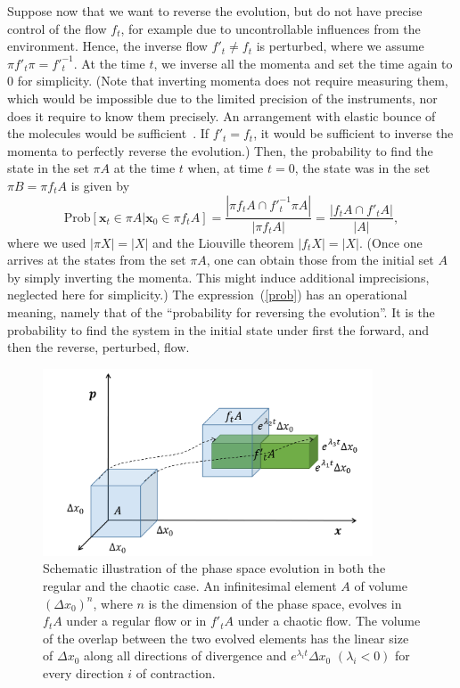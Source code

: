 \documentclass[12pt]{article}
\begin{document}
Suppose now that we want to reverse the evolution, but do not have precise control of the flow $f_t$, for example due to uncontrollable influences from the environment. Hence, the inverse flow $f'_t \neq f_t$ is perturbed, where we assume $\pi f'_t \pi =f'^{-1}_t$.
At the time $t$, we inverse all the momenta and set the time again to 0 for simplicity. (Note that inverting momenta does not require measuring them, which would be impossible due to the limited precision of the instruments, nor does it require to know them precisely. An arrangement with elastic bounce of the molecules would be sufficient~\cite{peres2}. If $f'_t=f_t$, it would be sufficient to inverse the momenta to perfectly reverse the evolution.) Then, the probability to find the state in the set $\pi A$ at the time $t$ when, at time $t=0$, the state was in the set $\pi B= \pi f_tA$ is given by
\begin{equation}
\mbox{Prob}[\mathbf{x}_t \in \pi A| \mathbf{x}_0 \in \pi f_t A] = \frac{|\pi f_t A \cap f'^{-1}_t \pi A|}{|\pi f_t A|} = \frac{|f_t A \cap f'_t A|}{|A|},\label{prob}
\end{equation}
where we used $|\pi X|=|X|$ and the Liouville theorem $|f_t X|=|X|$. (Once one arrives at the states from the set $\pi A$, one can obtain those from the initial set $A$ by simply inverting the momenta. This might induce additional imprecisions, neglected here for simplicity.) The expression~(\ref{prob}) has an operational meaning, namely that of the ``probability for reversing the evolution''. It is the probability to find the system in the initial state under first the forward, and then the reverse, perturbed, flow.

\begin{figure}
\begin{center}
\includegraphics[width=9.8cm]{Slika.png}
\end{center}
\caption{Schematic illustration of the phase space evolution in both the regular and the chaotic case. An infinitesimal element $A$ of volume $(\Delta x_0)^n$, where $n$ is the dimension of the phase space, evolves in $f_tA$ under a regular flow or in $f'_tA$ under a chaotic flow. The volume of the overlap between the two evolved elements has the linear size of $\Delta x_0$ along all directions of divergence and $e^{\lambda_i t} \Delta x_0$ $(\lambda_i <0)$ for every direction $i$ of contraction.} \label{figure1}
\end{figure}
\end{document}
